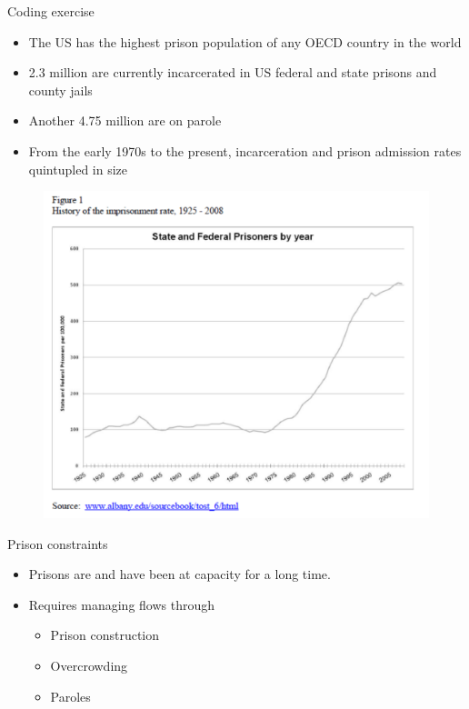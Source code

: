 \documentclass{beamer}
\begin{document}
\begin{frame}{Coding exercise}
	
	\begin{itemize}
	\item The US has the highest prison population of any OECD country in the world 
	\item 2.3 million are currently incarcerated in US federal and state prisons and county jails
	\item Another 4.75 million are on parole
	\item From the early 1970s to the present, incarceration and prison admission rates quintupled in size
	\end{itemize}
\end{frame}



\begin{frame}[plain]

\begin{figure}
\includegraphics[scale=0.5]{./lecture_includes/cook2010.pdf}
\end{figure}
\end{frame}


\begin{frame}{Prison constraints}

	
	\begin{itemize}
	\item Prisons are and have been at capacity for a long time.  
	\item Requires managing flows through
		\begin{itemize}
		\item Prison construction
		\item Overcrowding
		\item Paroles
		\end{itemize}
	\end{itemize}
\end{frame}
\end{document}
